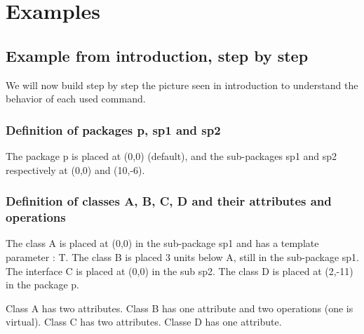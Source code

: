 \documentclass[a4paper,11pt]{report}
\newcommand{\inputTikZ}[1]{%
  }%
\newcommand{\inputTikZ}[1]{%
    \texttt{[image: fig/\#1.pdf]}%
  }%
\begin{document}
\section{Examples}

\subsection{Example from introduction, step by step}

We will now build step by step the picture seen in introduction to understand the behavior of each used command.

\subsubsection{Definition of packages p, sp1 and sp2}

The package p is placed at (0,0) (default), and the sub-packages sp1 and sp2 respectively at (0,0) and (10,-6).

{\color{red!70!black}
\vspace{-0.4cm}
\vspace{-0.4cm}
\vspace{-0.4cm}

}

\begin{center}
\inputTikZ{classdiagstep1}
\end{center}

\subsubsection{Definition of classes A, B, C, D and their attributes and operations}

The class A is placed at (0,0) in the sub-package sp1 and has a template parameter : T. The class B is placed 3 units below A, still in the sub-package sp1. The interface C is placed at (0,0) in the sub sp2. 
The class D is placed at (2,-11) in the package p.

Class A has two attributes. Class B has one attribute and two operations (one is virtual). Class C has two attributes. Classe D has one attribute.

\vspace{-0.4cm}
{\color{red!70!black}
\vspace{-0.4cm}
}
\vspace{-0.4cm}
{\color{red!70!black}
\vspace{-0.4cm}
}
\vspace{-0.4cm}
{\color{red!70!black}
\vspace{-0.4cm}
}

\end{document}
